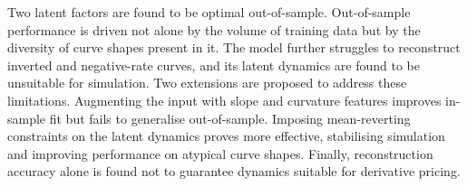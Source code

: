 \documentclass[
  paper=A4,
  11pt,
  twoside=true,
  parskip=full,
  chapterprefix=true,
  headings=normal,
  bibliography=totoc,
  listof=totoc,
  titlepage=on,
  captions=tableabove,
  abstract=on
]{scrreprt}
\theoremstyle{definition}
\theoremstyle{remark}
\begin{document}
Two latent factors are found to be optimal out-of-sample. Out-of-sample performance is driven not alone by the volume of training data but by the diversity of curve shapes present in it. The model further struggles to reconstruct inverted and negative-rate curves, and its latent dynamics are found to be unsuitable for simulation. Two extensions are proposed to address these limitations. Augmenting the input with slope and curvature features improves in-sample fit but fails to generalise out-of-sample. Imposing mean-reverting constraints on the latent dynamics proves more effective, stabilising simulation and improving performance on atypical curve shapes. Finally, reconstruction accuracy alone is found not to guarantee dynamics suitable for derivative pricing.




\clearpage



\tableofcontents
\clearpage



\setcounter{page}{1}





% 

%



%



%



%


%



%

%

\clearpage

\printbibliography

%

%
\end{document}

